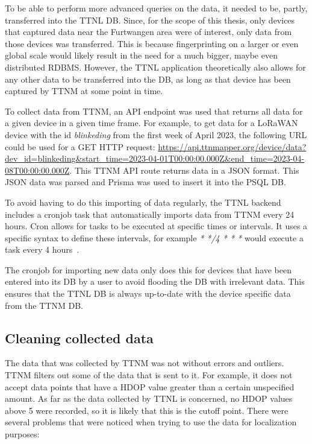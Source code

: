 To be able to perform more advanced queries on the data, it needed to be, partly, transferred into the \ac{TTNL} \acl{DB}.
Since, for the scope of this thesis, only devices that captured data near the Furtwangen area were of interest, only data from those devices was transferred.
This is because fingerprinting on a larger or even global scale would likely result in the need for a much bigger, maybe even distributed \ac{RDBMS}.
However, the \ac{TTNL} application theoretically also allows for any other data to be transferred into the \ac{DB}, as long as that device has been captured by \ac{TTNM} at some point in time.

To collect data from \ac{TTNM}, an \ac{API} endpoint was used that returns all data for a given device in a given time frame.
For example, to get data for a \ac{LoRaWAN} device with the id \emph{blinkeding} from the first week of April 2023, the following \ac{URL} could be used for a GET \ac{HTTP} request: \url{https://api.ttnmapper.org/device/data?dev_id=blinkeding&start_time=2023-04-01T00:00:00.000Z&end_time=2023-04-08T00:00:00.000Z}.
This \ac{TTNM} \ac{API} route returns data in a \ac{JSON} format.
This \ac{JSON} data was parsed and Prisma was used to insert it into the \ac{PSQL} \ac{DB}.

To avoid having to do this importing of data regularly, the \ac{TTNL} backend includes a cronjob task that automatically imports data from \ac{TTNM} every 24 hours.
Cron allows for tasks to be executed at specific times or intervals.
It uses a specific syntax to define these intervals, for example \emph{* */4 * * *} would execute a task every 4 hours~\cite{drake_how_2020}.

The cronjob for importing new data only does this for devices that have been entered into its \ac{DB} by a user to avoid flooding the \ac{DB} with irrelevant data.
This ensures that the \ac{TTNL} \ac{DB} is always up-to-date with the device specific data from the \ac{TTNM} \ac{DB}.

\subsection{Cleaning collected data}\label{subsec:cleaning-collected-data}

The data that was collected by \ac{TTNM} was not without errors and outliers.
\ac{TTNM} filters out some of the data that is sent to it.
For example, it does not accept data points that have a \ac{HDOP} value greater than a certain unspecified amount.
As far as the data collected by \ac{TTNL} is concerned, no \ac{HDOP} values above 5 were recorded, so it is likely that this is the cutoff point.
There were several problems that were noticed when trying to use the data for localization purposes:


